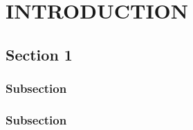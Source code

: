 
\chapter{INTRODUCTION} %
\section{Section 1} %
\lipsum[1]
\subsection{Subsection} %
\lipsum[2-3]
\subsection{Subsection} %
\lipsum[4-5]
